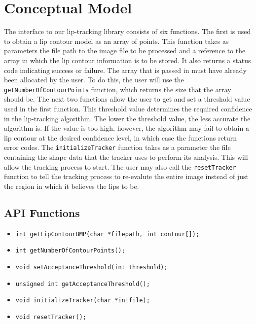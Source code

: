\chapter{Conceptual Model}

The interface to our lip-tracking library consists of six functions. The first is used to obtain a lip contour model as an array of points. This function takes as parameters the file path to the image file to be processed and a reference to the array in which the lip contour information is to be stored. It also returns a status code indicating success or failure. The array that is passed in must have already been allocated by the user. To do this, the user will use the \texttt{getNumberOfContourPoints} function, which returns the size that the array should be. The next two functions allow the user to get and set a threshold value used in the first function. This threshold value determines the required confidence in the lip-tracking algorithm. The lower the threshold value, the less accurate the algorithm is. If the value is too high, however, the algorithm may fail to obtain a lip contour at the desired confidence level, in which case the functions return error codes. The \texttt{initializeTracker} function takes as a parameter the file containing the shape data that the tracker uses to perform its analysis. This will allow the tracking process to start. The user may also call the \texttt{resetTracker} function to tell the tracking process to re-evalute the entire image instead of just the region in which it believes the lips to be.

\section{API Functions}
\begin{itemize}
\item \texttt{int getLipContourBMP(char *filepath, int contour[]);}
\item \texttt{int getNumberOfContourPoints();}
\item \texttt{void setAcceptanceThreshold(int threshold);}
\item \texttt{unsigned int getAcceptanceThreshold();}
\item \texttt{void initializeTracker(char *inifile);}
\item \texttt{void resetTracker();}
\end{itemize}